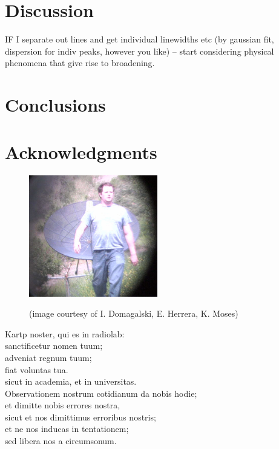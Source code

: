 \documentclass[10pt]{article}
\begin{document}
\section{Discussion}

IF I separate out lines and get individual linewidths etc (by gaussian fit, dispersion for indiv peaks, however you like) -- start considering physical phenomena that give rise to broadening.

\section{Conclusions}

\section{Acknowledgments}

\begin{figure}[!ht]
    \centering
    \includegraphics[width=0.5\textwidth]{kartp2.png} \\
    \caption{(image courtesy of I. Domagalski, E. Herrera, K. Moses)}
    \label{fig:kartp2}
\end{figure}

\begin{center}
Kartp noster, qui es in radiolab:\\
sanctificetur nomen tuum;\\
adveniat regnum tuum;\\
fiat voluntas tua.\\
sicut in academia, et in universitas.\\
Observationem nostrum cotidianum da nobis hodie;\\
et dimitte nobis errores nostra,\\
sicut et nos dimittimus erroribus nostris;\\
et ne nos inducas in tentationem;\\
sed libera nos a circumsonum.
\end{center}
\end{document}
